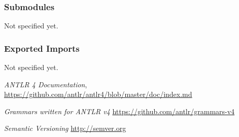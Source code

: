 \documentclass[a4paper,12pt]{article}
\begin{document}
\subsubsection{Submodules}

Not specified yet.

\subsubsection{Exported Imports}

Not specified yet.

\clearpage

\begin{thebibliography}{0}

    \textit{ANTLR 4 Documentation},
    \url{https://github.com/antlr/antlr4/blob/master/doc/index.md}

    \textit{Grammars written for ANTLR v4}
    \url{https://github.com/antlr/grammars-v4}

    \textit{Semantic Versioning}
    \url{http://semver.org}
        
\end{thebibliography}
\end{document}
